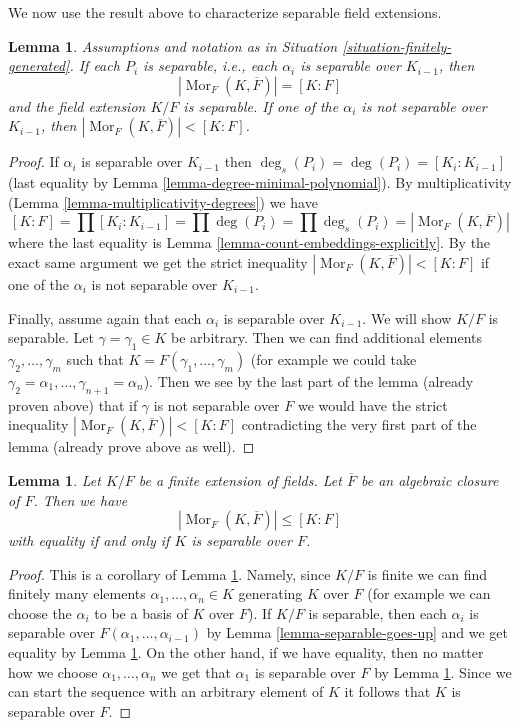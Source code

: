 \documentclass{stacks-project}
\theoremstyle{plain}
\newtheorem{lemma}[subsection]{Lemma}
\theoremstyle{definition}
\theoremstyle{remark}
\numberwithin{equation}{subsection}
\def\Mor{\mathop{\mathrm{Mor}}\nolimits}
\begin{document}
\noindent
We now use the result above to characterize separable field extensions.

\begin{lemma}
\label{lemma-separably-generated-separable}
Assumptions and notation as in Situation \ref{situation-finitely-generated}.
If each $P_i$ is separable, i.e., each $\alpha_i$ is separable over
$K_{i - 1}$, then
$$
|\Mor_F(K, \overline{F})| = [K : F]
$$
and the field extension $K/F$ is separable. If one of the $\alpha_i$ is
not separable over $K_{i - 1}$, then
$|\Mor_F(K, \overline{F})| < [K : F]$.
\end{lemma}

\begin{proof}
If $\alpha_i$ is separable over $K_{i - 1}$ then
$\deg_s(P_i) = \deg(P_i) = [K_i : K_{i - 1}]$
(last equality by Lemma \ref{lemma-degree-minimal-polynomial}).
By multiplicativity (Lemma \ref{lemma-multiplicativity-degrees}) we have
$$
[K : F] = \prod [K_i : K_{i - 1}] = \prod \deg(P_i) =
\prod \deg_s(P_i) = |\Mor_F(K, \overline{F})|
$$
where the last equality is Lemma \ref{lemma-count-embeddings-explicitly}.
By the exact same argument we get the strict inequality
$|\Mor_F(K, \overline{F})| < [K : F]$ if one of the $\alpha_i$ is
not separable over $K_{i - 1}$.

\medskip\noindent
Finally, assume again that each $\alpha_i$ is separable over $K_{i - 1}$.
We will show $K/F$ is separable.
Let $\gamma = \gamma_1 \in K$ be arbitrary. Then we can find additional
elements $\gamma_2, \ldots, \gamma_m$ such that
$K = F(\gamma_1, \ldots, \gamma_m)$ (for example we could take
$\gamma_2 = \alpha_1, \ldots, \gamma_{n + 1} = \alpha_n$).
Then we see by the last part of the lemma (already proven above)
that if $\gamma$ is not separable over $F$ we would have the
strict inequality $|\Mor_F(K, \overline{F})| < [K : F]$
contradicting the very first part of the lemma (already prove above
as well).
\end{proof}

\begin{lemma}
\label{lemma-separable-equality}
Let $K/F$ be a finite extension of fields. Let $\overline{F}$ be an
algebraic closure of $F$. Then we have
$$
|\Mor_F(K, \overline{F})| \leq [K : F]
$$
with equality if and only if $K$ is separable over $F$.
\end{lemma}

\begin{proof}
This is a corollary of Lemma \ref{lemma-separably-generated-separable}.
Namely, since $K/F$ is finite we can find finitely many elements
$\alpha_1, \ldots, \alpha_n \in K$ generating $K$ over $F$ (for example
we can choose the $\alpha_i$ to be a basis of $K$ over $F$).
If $K/F$ is separable, then each $\alpha_i$ is separable over
$F(\alpha_1, \ldots, \alpha_{i - 1})$ by Lemma \ref{lemma-separable-goes-up}
and we get equality by Lemma \ref{lemma-separably-generated-separable}.
On the other hand, if we have equality, then no matter how we choose
$\alpha_1, \ldots, \alpha_n$ we get that $\alpha_1$ is separable over
$F$ by Lemma \ref{lemma-separably-generated-separable}. Since we
can start the sequence with an arbitrary element of $K$ it follows
that $K$ is separable over $F$.
\end{proof}
\end{document}
